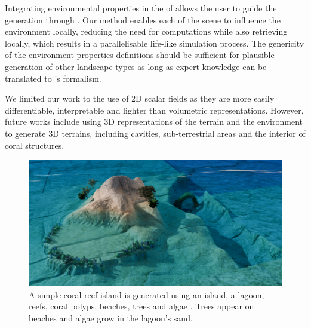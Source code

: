 Integrating environmental properties in the  of  allows the user to guide the generation through . Our method enables each  of the scene to influence the environment locally, reducing the need for computations while also retrieving  locally, which results in a parallelisable life-like simulation process. The genericity of the environment properties definitions should be sufficient for plausible generation of other landscape types as long as expert knowledge can be translated to 's formalism.

We limited our work to the use of 2D scalar fields as they are more easily differentiable, interpretable and lighter than volumetric representations. However, future works include using 3D representations of the terrain and the environment to generate 3D terrains, including cavities, sub-terrestrial areas and the interior of coral structures.

\begin{figure}[H]
    \includegraphics{multiScene1 v2 final 1.png}
    \caption{A simple coral reef island is generated using an island, a lagoon, reefs, coral polyps, beaches, trees and algae . Trees appear on beaches and algae grow in the lagoon's sand.}
    \label{fig:env-obj-coral-island-scene}
\end{figure}





















